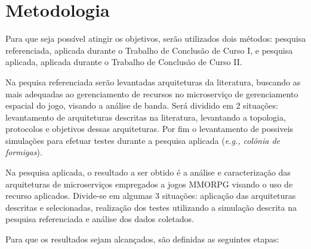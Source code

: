 \section{Metodologia}
\label{met}

Para que seja poss\'{i}vel atingir os objetivos, serão utilizados dois métodos: pesquisa referenciada, aplicada durante o Trabalho de Conclusão de Curso I, e pesquisa aplicada, aplicada durante o Trabalho de Conclusão de Curso II.

Na pequisa referenciada serão levantadas arquiteturas da literatura, buscando as mais adequadas ao gerenciamento de recursos no microserviço de gerenciamento espacial do jogo, visando a análise de banda. Será dividido em 2 situações: levantamento de arquiteturas descritas na literatura, levantando a topologia, protocolos e objetivos dessas arquiteturas. Por fim o levantamento de possiveis simulações para efetuar testes durante a pesquisa aplicada (\textit{e.g., colônia de formigas}).

Na pesquisa aplicada, o resultado a ser obtido é a análise e caracterização das arquiteturas de microserviços empregados a jogos MMORPG visando o uso de recurso aplicados. Divide-se em algumas 3 situações: aplicação das arquiteturas descritas e selecionadas, realização dos testes utilizando a simulação descrita na pesquisa referenciada e análise dos dados coletados.

Para que os resultados sejam alcançados, são definidas as seguintes etapas:

